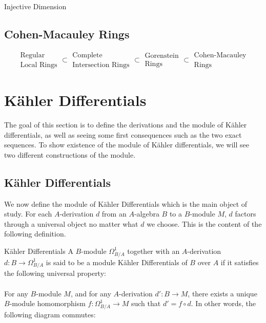 \documentclass[a4paper]{article}
\begin{document}
\begin{defn}{Injective Dimension}{}
\end{defn}

\subsection{Cohen-Macauley Rings}

$$\substack{\text{Regular}\\\text{Local Rings}}\subset\substack{\text{Complete}\\\text{Intersection Rings}}\subset\substack{\text{Gorenstein}\\\text{Rings}}\subset\substack{\text{Cohen-Macauley}\\\text{Rings}}$$

\pagebreak
\section{Kähler Differentials}
The goal of this section is to define the derivations and the module of Kähler differentials, as well as seeing some first consequences such as the two exact sequences. To show existence of the module of Kähler differentials, we will see two different constructions of the module. 

\subsection{Kähler Differentials}
We now define the module of Kähler Differentials which is the main object of study. For each $A$-derivation $d$ from an $A$-algebra $B$ to a $B$-module $M$, $d$ factors through a universal object no matter what $d$ we choose. This is the content of the following definition. 

\begin{defn}{Kähler Differentials}{} A $B$-module $\Omega_{B/A}^1$ together with an $A$-derivation $d:B\to\Omega_{B/A}^1$ is said to be a module Kähler Differentials of $B$ over $A$ if it satisfies the following universal property: \\~\\
For any $B$-module $M$, and for any $A$-derivation $d':B\to M$, there exists a unique $B$-module homomorphism $f:\Omega_{B/A}^1\to M$ such that $d'=f\circ d$. In other words, the following diagram commutes: \\~\\
\end{defn}
\end{document}
